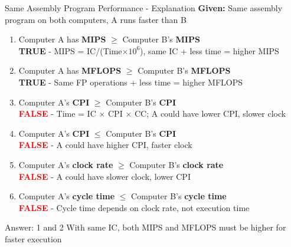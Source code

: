 \documentclass[aspectratio=169,12pt]{beamer}
\begin{document}
\begin{frame}{Same Assembly Program Performance - Explanation}
\scriptsize
\textbf{Given:} Same assembly program on both computers, A runs faster than B

\begin{enumerate}
    \scriptsize
    \item Computer A has \textbf{MIPS} $\geq$ Computer B's \textbf{MIPS}\\
    \pause
    \hspace{1em}\colorbox{green!20}{\textcolor{green!50!black}{\textbf{TRUE}}} - MIPS = IC/(Time$\times 10^6$), same IC + less time = higher MIPS
    \pause

    \item Computer A has \textbf{MFLOPS} $\geq$ Computer B's \textbf{MFLOPS}\\
    \pause
    \hspace{1em}\colorbox{green!20}{\textcolor{green!50!black}{\textbf{TRUE}}} - Same FP operations + less time = higher MFLOPS
    \pause

    \item Computer A's \textbf{CPI} $\geq$ Computer B's \textbf{CPI}\\
    \pause
    \hspace{1em}\colorbox{red!20}{\textcolor{red}{\textbf{FALSE}}} - Time = IC $\times$ CPI $\times$ CC; A could have lower CPI, slower clock
    \pause

    \item Computer A's \textbf{CPI} $\leq$ Computer B's \textbf{CPI}\\
    \pause
    \hspace{1em}\colorbox{red!20}{\textcolor{red}{\textbf{FALSE}}} - A could have higher CPI, faster clock
    \pause

    \item Computer A's \textbf{clock rate} $\geq$ Computer B's \textbf{clock rate}\\
    \pause
    \hspace{1em}\colorbox{red!20}{\textcolor{red}{\textbf{FALSE}}} - A could have slower clock, lower CPI
    \pause

    \item Computer A's \textbf{cycle time} $\leq$ Computer B's \textbf{cycle time}\\
    \pause
    \hspace{1em}\colorbox{red!20}{\textcolor{red}{\textbf{FALSE}}} - Cycle time depends on clock rate, not execution time
\end{enumerate}

\pause
\begin{alertblock}{Answer: 1 and 2}
With same IC, both MIPS and MFLOPS must be higher for faster execution
\end{alertblock}
\end{frame}
\end{document}
